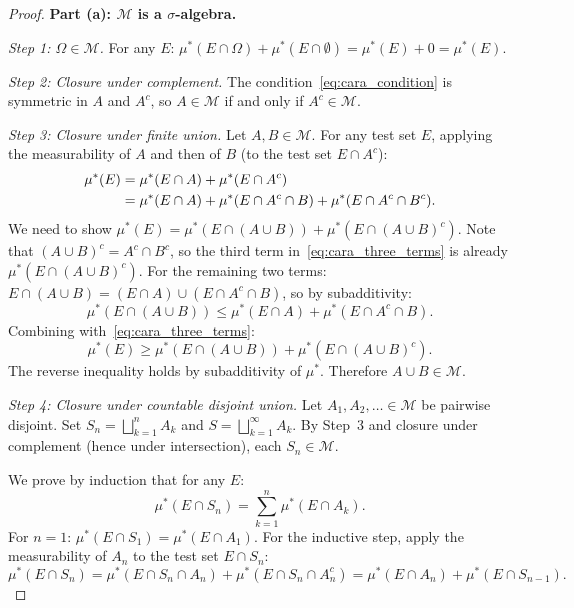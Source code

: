 \documentclass[11pt,a4paper]{article}
\begin{document}
\begin{proof}
\textbf{Part (a): $\mathcal{M}$ is a $\sigma$-algebra.}

\textit{Step 1: $\Omega \in \mathcal{M}$.} For any $E$:
$\mu^*(E \cap \Omega) + \mu^*(E \cap \emptyset)
= \mu^*(E) + 0 = \mu^*(E)$.

\textit{Step 2: Closure under complement.} The
condition~\eqref{eq:cara_condition} is symmetric in $A$ and $A^c$, so
$A \in \mathcal{M}$ if and only if $A^c \in \mathcal{M}$.

\textit{Step 3: Closure under finite union.} Let
$A, B \in \mathcal{M}$. For any test set $E$, applying the
measurability of $A$ and then of $B$ (to the test set $E \cap A^c$):
\begin{align}
  \mu^*(E)
    &= \mu^*(E \cap A) + \mu^*(E \cap A^c) \notag \\
    &= \mu^*(E \cap A)
      + \mu^*(E \cap A^c \cap B)
      + \mu^*(E \cap A^c \cap B^c). \label{eq:cara_three_terms}
\end{align}
We need to show $\mu^*(E) = \mu^*(E \cap (A \cup B))
+ \mu^*(E \cap (A \cup B)^c)$. Note that
$(A \cup B)^c = A^c \cap B^c$, so the third term
in~\eqref{eq:cara_three_terms} is already
$\mu^*(E \cap (A \cup B)^c)$. For the remaining two terms:
$E \cap (A \cup B) = (E \cap A) \cup (E \cap A^c \cap B)$, so by
subadditivity:
\begin{equation}
  \mu^*(E \cap (A \cup B)) \leq \mu^*(E \cap A)
    + \mu^*(E \cap A^c \cap B).
\end{equation}
Combining with~\eqref{eq:cara_three_terms}:
\begin{equation}
  \mu^*(E) \geq \mu^*(E \cap (A \cup B))
    + \mu^*(E \cap (A \cup B)^c).
\end{equation}
The reverse inequality holds by subadditivity of $\mu^*$. Therefore
$A \cup B \in \mathcal{M}$.

\textit{Step 4: Closure under countable disjoint union.} Let
$A_1, A_2, \ldots \in \mathcal{M}$ be pairwise disjoint. Set
$S_n = \bigsqcup_{k=1}^n A_k$ and
$S = \bigsqcup_{k=1}^\infty A_k$. By Step~3 and closure under
complement (hence under intersection), each $S_n \in \mathcal{M}$.

We prove by induction that for any $E$:
\begin{equation}
  \mu^*(E \cap S_n) = \sum_{k=1}^n \mu^*(E \cap A_k).
  \label{eq:finite_additivity_outer}
\end{equation}
For $n = 1$: $\mu^*(E \cap S_1) = \mu^*(E \cap A_1)$. For the
inductive step, apply the measurability of $A_n$ to the test set
$E \cap S_n$:
\begin{equation}
  \mu^*(E \cap S_n)
    = \mu^*(E \cap S_n \cap A_n) + \mu^*(E \cap S_n \cap A_n^c)
    = \mu^*(E \cap A_n) + \mu^*(E \cap S_{n-1}).
\end{equation}


\end{proof}
\end{document}
